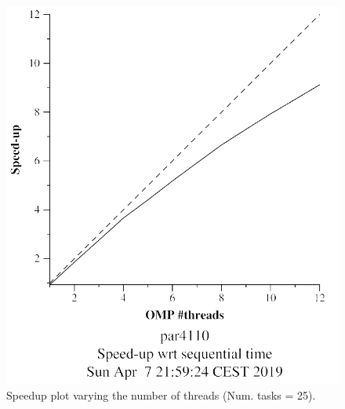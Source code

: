 \documentclass[12pt, a4paper]{article}
\begin{document}
\begin{figure}[H]
\begin{minipage}[b]{0.4\linewidth}
  \includegraphics[scale=0.5]{./mandel-omp-10000-strong-omp-24-25-speedup}
  \caption{Speedup plot varying the number of threads (Num. tasks = 25).}
  \label{fig:mandel-omp-10000-strong-omp-24-25-speedup}
\end{minipage}
\end{figure}
\end{document}
